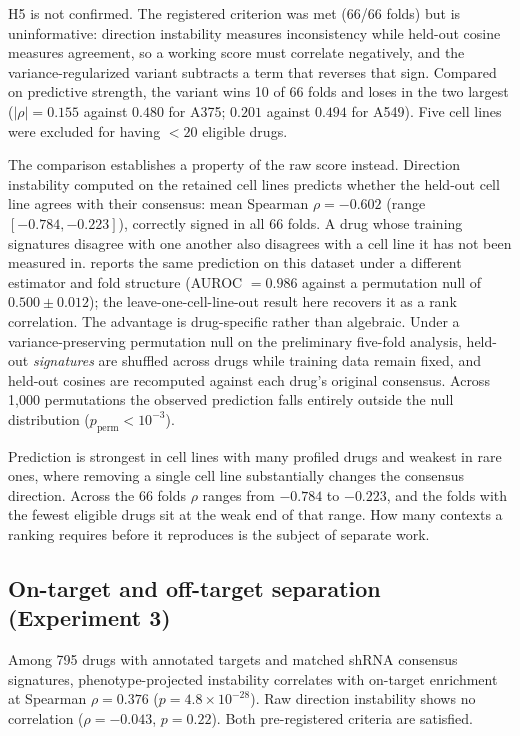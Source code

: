\documentclass[11pt]{article}
\begin{document}
H5 is not confirmed. The registered criterion was met (66/66 folds) but
is uninformative: direction instability measures inconsistency while
held-out cosine measures agreement, so a working score must correlate
negatively, and the variance-regularized variant subtracts a term that
reverses that sign. Compared on predictive strength, the variant wins 10
of 66 folds and loses in the two largest ($|\rho| = 0.155$ against
$0.480$ for A375; $0.201$ against $0.494$ for A549). Five cell lines were
excluded for having $< 20$ eligible drugs.

The comparison establishes a property of the raw score instead. Direction
instability computed on the retained cell lines predicts whether the
held-out cell line agrees with their consensus: mean Spearman
$\rho = -0.602$ (range $[-0.784, -0.223]$), correctly signed in all 66
folds. A drug whose training signatures disagree with one another also
disagrees with a cell line it has not been measured in.
\citet{tower2026drug} reports the same prediction on this dataset under a
different estimator and fold structure (AUROC $= 0.986$ against a permutation
null of $0.500 \pm 0.012$); the leave-one-cell-line-out result here recovers it
as a rank correlation.
The advantage is drug-specific rather than algebraic. Under a
variance-preserving permutation null on the preliminary five-fold analysis,
held-out \emph{signatures} are shuffled across drugs while training data
remain fixed, and held-out cosines are recomputed against each drug's
original consensus. Across 1{,}000 permutations the observed prediction
falls entirely outside the null distribution
($p_{\text{perm}} < 10^{-3}$).

Prediction is strongest in cell lines with many profiled drugs and weakest
in rare ones, where removing a single cell line substantially changes the
consensus direction. Across the 66 folds $\rho$ ranges from $-0.784$ to
$-0.223$, and the folds with the fewest eligible drugs sit at the weak end
of that range. How many contexts a ranking requires before it reproduces is
the subject of separate work.


\subsection{On-target and off-target separation (Experiment 3)}

Among 795 drugs with annotated targets and matched shRNA consensus signatures,
phenotype-projected instability correlates with on-target enrichment at Spearman
$\rho = 0.376$ ($p = 4.8 \times 10^{-28}$). Raw direction instability shows no correlation
($\rho = -0.043$, $p = 0.22$). Both pre-registered criteria are satisfied.
\end{document}
